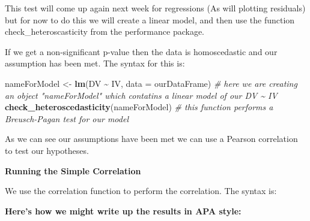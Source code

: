 \documentclass[
]{book}
\newenvironment{Shaded}{\begin{snugshade}}{\end{snugshade}}
\newcommand{\AttributeTok}[1]{\textcolor[rgb]{0.13,0.29,0.53}{#1}}
\newcommand{\CommentTok}[1]{\textcolor[rgb]{0.56,0.35,0.01}{\textit{#1}}}
\newcommand{\FunctionTok}[1]{\textcolor[rgb]{0.13,0.29,0.53}{\textbf{#1}}}
\newcommand{\NormalTok}[1]{#1}
\newcommand{\OtherTok}[1]{\textcolor[rgb]{0.56,0.35,0.01}{#1}}
\newcommand{\SpecialCharTok}[1]{\textcolor[rgb]{0.81,0.36,0.00}{\textbf{#1}}}
\newcommand{\StringTok}[1]{\textcolor[rgb]{0.31,0.60,0.02}{#1}}
\begin{document}
This test will come up again next week for regressions (As will plotting residuals) but for now to do this we will create a linear model, and then use the function check\_heteroscasticity from the performance package.

If we get a non-significant p-value then the data is homoscedastic and our assumption has been met. The syntax for this is:

\begin{Shaded}
\begin{Highlighting}[]
\NormalTok{nameForModel }\OtherTok{\textless{}{-}} \FunctionTok{lm}\NormalTok{(DV }\SpecialCharTok{\textasciitilde{}}\NormalTok{ IV, }\AttributeTok{data =}\NormalTok{ ourDataFrame) }\CommentTok{\# here we are creating an object "nameForModel" which contatins a linear model of our DV \textasciitilde{} IV }
\FunctionTok{check\_heteroscedasticity}\NormalTok{(nameForModel) }\CommentTok{\# this function performs a Breusch{-}Pagan test for our model}
\end{Highlighting}
\end{Shaded}

As we can see our assumptions have been met we can use a Pearson correlation to test our hypotheses.

\textbf{Running the Simple Correlation}

We use the correlation function to perform the correlation. The syntax is:

\begin{Shaded}
\end{Shaded}

\textbf{Here's how we might write up the results in APA style:}
\end{document}
